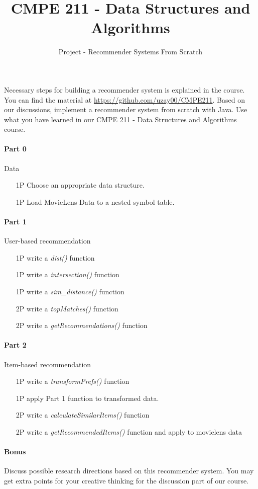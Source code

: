 \documentclass{article}
\begin{document}
\author{Project - Recommender Systems From Scratch}
\title{CMPE 211 - Data Structures and Algorithms}




\date{}
\maketitle
\setcounter{secnumdepth}{0}


Necessary steps for building a recommender system is explained in the course. You can find the material at \url{https://github.com/uzay00/CMPE211}. Based on our discussions,
implement a recommender system from scratch with Java. Use what you have learned in our 
CMPE 211 - Data Structures and Algorithms course.

\paragraph{Part 0} Data
\begin{enumerate}
\item[1P] Choose an appropriate data structure. 
\item[1P] Load MovieLens Data to a nested symbol table.
\end{enumerate}

\paragraph{Part 1} User-based recommendation
\begin{enumerate}
\item[1P] write a \emph{dist()} function
\item[1P] write a \emph{intersection()} function
\item[1P] write a \emph{sim\_distance()} function
\item[2P] write a \emph{topMatches()} function
\item[2P] write a \emph{getRecommendations()} function
\end{enumerate}


\paragraph{Part 2} Item-based recommendation
\begin{enumerate}
\item[1P] write a \emph{transformPrefs()} function
\item[1P] apply Part 1 function to transformed data.
\item[2P] write a \emph{calculateSimilarItems()} function
\item[2P] write a \emph{getRecommendedItems()} function and apply to movielens data

\end{enumerate}

\paragraph{Bonus} Discuss possible research directions based on this recommender system. You may get extra points for your creative thinking for the discussion part of our course. 
\end{document}
